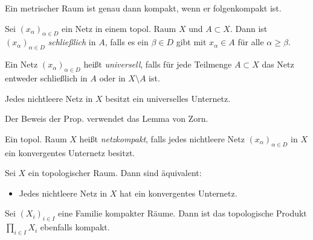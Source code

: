 \documentclass{cheat-sheet}
\begin{document}
\begin{prop}
  Ein metrischer Raum ist genau dann kompakt, wenn er folgenkompakt ist.
\end{prop}

\begin{defn}
  Sei $(x_\alpha)_{\alpha \in D}$ ein Netz in einem topol. Raum $X$ und $A \subset X$. Dann ist $(x_\alpha)_{\alpha \in D}$ \emph{schließlich} in $A$, falls es ein $\beta \in D$ gibt mit $x_\alpha \in A$ für alle $\alpha \geq \beta$.
\end{defn}


\begin{defn}
  Ein Netz $(x_\alpha)_{\alpha \in D}$ heißt \emph{universell}, falls für jede Teilmenge $A \subset X$ das Netz entweder schließlich in $A$ oder in $X \setminus A$ ist.
\end{defn}


\begin{prop}
  Jedes nichtleere Netz in $X$ besitzt ein universelles Unternetz.
\end{prop}

\begin{bem}
  Der Beweis der Prop. verwendet das Lemma von Zorn.
\end{bem}

\begin{defn}
  Ein topol. Raum $X$ heißt \emph{netzkompakt}, falls jedes nichtleere Netz $(x_\alpha)_{\alpha \in D}$ in $X$ ein konvergentes Unternetz besitzt.
\end{defn}

\begin{satz}
  Sei $X$ ein topologischer Raum. Dann sind äquivalent:
  \begin{itemize}
    \item Jedes nichtleere Netz in $X$ hat ein konvergentes Unternetz.
  \end{itemize}
\end{satz}

\begin{satz}
  Sei $(X_i)_{i \in I}$ eine Familie kompakter Räume. Dann ist das topologische Produkt $\prod_{i \in I} X_i$ ebenfalls kompakt.
\end{satz}

\end{document}
